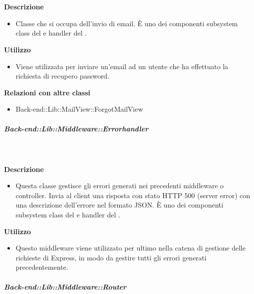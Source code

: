         \textbf{\\ \\ Descrizione} 
          \begin{itemize}
            \item[] Classe che si occupa dell'invio di email. È uno dei componenti subsystem class del   e handler del  .
          \end{itemize}      
        \textbf{Utilizzo}  
          \begin{itemize}
            \item[] Viene utilizzata per inviare un'email ad un utente che ha effettuato la richiesta di recupero password.
          \end{itemize}
          \textbf{Relazioni con altre classi}
          \begin{itemize}
              \item{Back-end::Lib::MailView::ForgotMailView}
          \end{itemize}
      \subparagraph{Back-end::Lib::Middleware::Errorhandler}
        
        \textbf{\\ \\ Descrizione} 
          \begin{itemize}
            \item[] Questa classe gestisce gli errori generati nei precedenti middleware o controller. Invia al client una risposta con stato HTTP 500 (server error) con una descrizione dell'errore nel formato JSON.
È uno dei componenti subsystem class del   e handler del  .
          \end{itemize}      
        \textbf{Utilizzo}  
          \begin{itemize}
            \item[] Questo middleware viene utilizzato per ultimo nella catena di gestione delle richieste di Express, in modo da gestire tutti gli errori generati precedentemente.
          \end{itemize}
      \subparagraph{Back-end::Lib::Middleware::Router}
        
